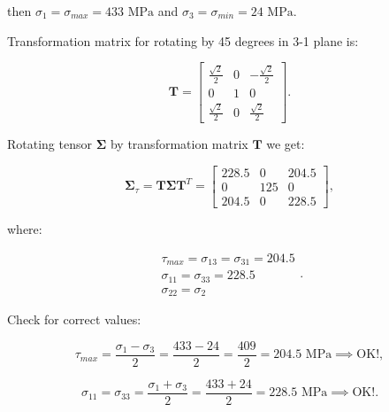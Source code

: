 \begin{itemize}
        then $\sigma_1 = \sigma_{max} = 433 \text{ MPa}$ and
        $\sigma_3 = \sigma_{min} = 24 \text{ MPa}$.

        Transformation matrix for rotating by 45 degrees in 3-1 plane is:

        \begin{equation}
            \mathbf{T} = \begin{bmatrix}
                \frac{\sqrt{2}}{2} & 0 & -\frac{\sqrt{2}}{2} \\
                0 & 1 & 0 \\
                \frac{\sqrt{2}}{2} & 0 & \frac{\sqrt{2}}{2}
            \end{bmatrix}
        .\end{equation}

        Rotating tensor $\mathbf{\Sigma}$ by transformation matrix $\mathbf{T}$ we get:

        \begin{equation}
            \mathbf{\Sigma}_{\tau} = \mathbf{T}\mathbf{\Sigma}\mathbf{T}^{T}
            = \begin{bmatrix}
                228.5 & 0 & 204.5 \\
                0 & 125 & 0 \\
                204.5 & 0 & 228.5
            \end{bmatrix}
        ,\end{equation}

        where:

        \begin{equation}
            \begin{array}{l}
                \tau_{max} = \sigma_{13} = \sigma_{31} = 204.5 \\
                \sigma_{11} = \sigma_{33} = 228.5 \\
                \sigma_{22} = \sigma_2
            \end{array}
        .\end{equation}

        Check for correct values:

        \begin{equation}
            \tau_{max} = \frac{\sigma_1 - \sigma_3}{2} = \frac{433 - 24}{2}
            = \frac{409}{2} = 204.5 \text{ MPa} \implies \text{OK!}
        ,\end{equation}

        \begin{equation}
            \sigma_{11} = \sigma_{33} = \frac{\sigma_1 + \sigma_3}{2}
            = \frac{433 + 24}{2} = 228.5 \text{ MPa} \implies \text{OK!}
        .\end{equation}


\end{itemize}
